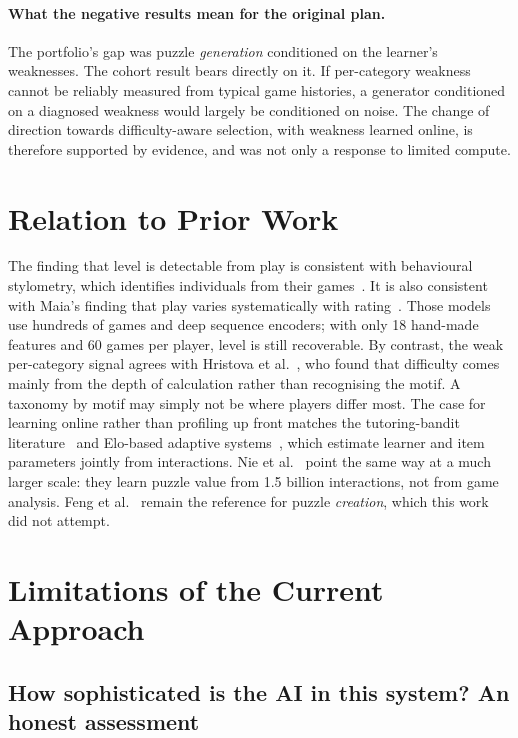 \paragraph{What the negative results mean for the original plan.} The portfolio's gap was puzzle
\emph{generation} conditioned on the learner's weaknesses. The cohort result bears directly on it. If
per-category weakness cannot be reliably measured from typical game histories, a generator conditioned
on a diagnosed weakness would largely be conditioned on noise. The change of direction towards
difficulty-aware selection, with weakness learned online, is therefore supported by evidence, and was
not only a response to limited compute.

\section{Relation to Prior Work}

The finding that level is detectable from play is consistent with behavioural stylometry, which
identifies individuals from their games~\cite{mcilroyyoung2021detecting}. It is also consistent with
Maia's finding that play varies systematically with rating~\cite{mcilroyyoung2020aligning}. Those
models use hundreds of games and deep sequence encoders; with only 18 hand-made features and 60 games
per player, level is still recoverable. By contrast, the weak per-category signal agrees with Hristova
et al.~\cite{hristova2014assessing}, who found that difficulty comes mainly from the depth of
calculation rather than recognising the motif. A taxonomy by motif may simply not be where players
differ most. The case for learning online rather than profiling up front matches the tutoring-bandit
literature~\cite{clement2015multi} and Elo-based adaptive systems~\cite{pelanek2016applications}, which
estimate learner and item parameters jointly from interactions. Nie et al.~\cite{nie2026discovering}
point the same way at a much larger scale: they learn puzzle value from 1.5 billion interactions, not
from game analysis. Feng et al.~\cite{feng2025generating} remain the reference for puzzle
\emph{creation}, which this work did not attempt.

\section{Limitations of the Current Approach}\label{sec:limitations}

\subsection{How sophisticated is the AI in this system? An honest assessment}

